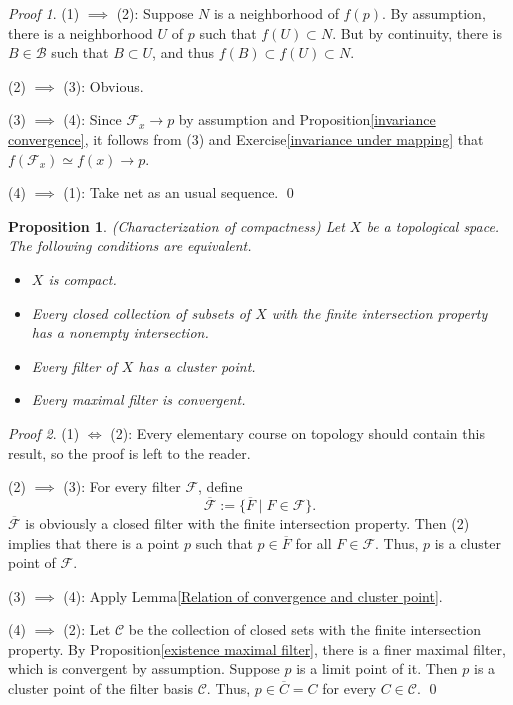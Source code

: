 \documentclass[a4paper,12pt]{article}
\newtheorem{prp}[thm]{Proposition}
\theoremstyle{remark}
\newtheorem*{prf}{Proof}
\theoremstyle{definition}
\theoremstyle{definition}
\theoremstyle{definition}
\begin{document}
\begin{prf}
	(1) \( \implies  \) (2):
	Suppose \( N \) is a neighborhood of \( f(p) \). By assumption, there is a neighborhood \( U \) of \( p \) such that \( f(U) \subset N \). But by continuity, there is \( B \in \mathscr{B} \) such that \( B \subset U \), and thus \( f(B) \subset f(U) \subset N \).

	(2) \( \implies \) (3): Obvious.

	(3) \( \implies \) (4):
	Since \( \mathscr{F}_x \to p \) by assumption and Proposition\ref{invariance convergence}, it follows from (3) and Exercise\ref{invariance under mapping} that \( f(\mathscr{F}_x) \simeq f(x)\to p \).

	(4) \( \implies \) (1): Take net as an usual sequence.
	\qed\end{prf}

\begin{prp}\label{characterize compact} (Characterization of compactness)
	Let \( X \) be a topological space. The following conditions are equivalent.
	\begin{itemize}
		\item[(1)] \( X \) is compact.
		\item[(2)] Every closed collection of subsets of \( X \) with the finite intersection property has a nonempty intersection.
		\item[(3)] Every filter of \( X \) has a cluster point.
		\item[(4)] Every maximal filter is convergent.
	\end{itemize}
\end{prp}
\begin{prf}
	(1) \( \iff \) (2):
	Every elementary course on topology should contain this result, so the proof is left to the reader.

	(2) \( \implies \) (3): For every filter \( \mathscr{F} \), define
	\begin{equation*}
		\overline{\mathscr{F}} := \{\overline{F} \mid F \in \mathscr{F}\}.
	\end{equation*}
	\( \overline{\mathscr{F}} \) is obviously a closed filter with the finite intersection property. Then (2) implies that there is a point \( p \) such that \( p \in \overline{F}\) for all \( F \in \mathscr{F} \). Thus, \( p \) is a cluster point of \( \mathscr{F} \).

	(3) \( \implies \) (4):
	Apply Lemma\ref{Relation of convergence and cluster point}.

	(4) \( \implies \) (2): Let \( \mathscr{C} \) be the collection of closed sets with the finite intersection property. By Proposition\ref{existence maximal filter}, there is a finer maximal filter, which is convergent by assumption. Suppose \( p \) is a limit point of it. Then \( p \) is a cluster point of the filter basis \( \mathscr{C} \). Thus, \( p \in \overline{C} = C \) for every \( C \in \mathscr{C} \).
	\qed\end{prf}
\end{document}
